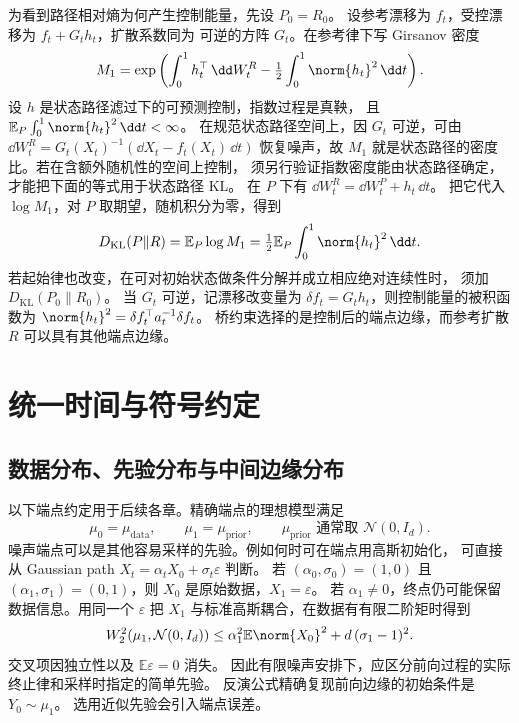 为看到路径相对熵为何产生控制能量，先设 \(P_0=R_0\)。
设参考漂移为 \(f_t\)，受控漂移为 \(f_t+G_t h_t\)，扩散系数同为
可逆的方阵 \(G_t\)。在参考律下写 Girsanov 密度
\[
  M_1=\exp\left(\int_0^1 h_t^\top\,\dd W_t^R
               -\tfrac12\int_0^1\norm{h_t}^2\,\dd t\right).
\]
设 \(h\) 是状态路径滤过下的可预测控制，指数过程是真鞅，
且 \(\mathbb E_P\int_0^1\norm{h_t}^2\,\dd t<\infty\)。
在规范状态路径空间上，因 \(G_t\) 可逆，可由
\(\dd W_t^R=G_t(X_t)^{-1}(\dd X_t-f_t(X_t)\,\dd t)\)
恢复噪声，故 \(M_1\) 就是状态路径的密度比。若在含额外随机性的空间上控制，
须另行验证指数密度能由状态路径确定，才能把下面的等式用于状态路径 KL。
在 \(P\) 下有 \(\dd W_t^R=\dd W_t^P+h_t\,\dd t\)。
把它代入 \(\log M_1\)，对 \(P\) 取期望，随机积分为零，得到
\begin{equation}
   D_{\mathrm{KL}}(P\|R)
     =\mathbb E_P\log M_1
     =\tfrac12\mathbb E_P\int_0^1\norm{h_t}^2\,\dd t .
   \label{eq:foundations-control-energy}
\end{equation}
若起始律也改变，在可对初始状态做条件分解并成立相应绝对连续性时，
须加 \(D_{\mathrm{KL}}(P_0\|R_0)\)。
当 \(G_t\) 可逆，记漂移改变量为 \(\delta f_t=G_th_t\)，则控制能量的被积函数为
\(\norm{h_t}^2=\delta f_t^\top a_t^{-1}\delta f_t\)。
桥约束选择的是控制后的端点边缘，而参考扩散 \(R\) 可以具有其他端点边缘。

\section{统一时间与符号约定}
\label{sec:notation}

\subsection{数据分布、先验分布与中间边缘分布}

以下端点约定用于后续各章。精确端点的理想模型满足
\begin{equation}
  \mu_0=\mu_{\mathrm{data}},\qquad
  \mu_1=\mu_{\mathrm{prior}},\qquad
  \mu_{\mathrm{prior}}\text{ 通常取 }\mathcal N(0,I_d).
  \label{eq:foundations-endpoints}
\end{equation}
噪声端点可以是其他容易采样的先验。例如何时可在端点用高斯初始化，
可直接从 Gaussian path \(X_t=\alpha_tX_0+\sigma_t\varepsilon\) 判断。
若 \((\alpha_0,\sigma_0)=(1,0)\) 且
\((\alpha_1,\sigma_1)=(0,1)\)，则 \(X_0\) 是原始数据，\(X_1=\varepsilon\)。
若 \(\alpha_1\ne0\)，终点仍可能保留数据信息。用同一个 \(\varepsilon\)
把 \(X_1\) 与标准高斯耦合，在数据有有限二阶矩时得到
\begin{equation}
  W_2^2(\mu_1,\mathcal N(0,I_d))
  \le \alpha_1^2\mathbb E\norm{X_0}^2+d\,(\sigma_1-1)^2 .
  \label{eq:foundations-prior-bound}
\end{equation}
交叉项因独立性以及 \(\mathbb E\varepsilon=0\) 消失。
因此有限噪声安排下，应区分前向过程的实际终止律和采样时指定的简单先验。
反演公式精确复现前向边缘的初始条件是 \(Y_0\sim\mu_1\)。
选用近似先验会引入端点误差。

